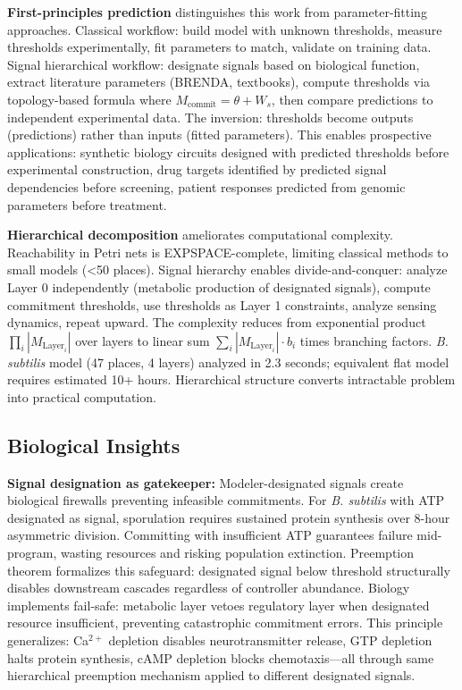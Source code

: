 \documentclass[10pt,letterpaper]{article}
\begin{document}
\textbf{First-principles prediction} distinguishes this work from parameter-fitting approaches. Classical workflow: build model with unknown thresholds, measure thresholds experimentally, fit parameters to match, validate on training data. Signal hierarchical workflow: designate signals based on biological function, extract literature parameters (BRENDA, textbooks), compute thresholds via topology-based formula where $M_{\text{commit}} = \theta + W_s$, then compare predictions to independent experimental data. The inversion: thresholds become outputs (predictions) rather than inputs (fitted parameters). This enables prospective applications: synthetic biology circuits designed with predicted thresholds before experimental construction, drug targets identified by predicted signal dependencies before screening, patient responses predicted from genomic parameters before treatment.

\textbf{Hierarchical decomposition} ameliorates computational complexity. Reachability in Petri nets is EXPSPACE-complete, limiting classical methods to small models (<50 places). Signal hierarchy enables divide-and-conquer: analyze Layer 0 independently (metabolic production of designated signals), compute commitment thresholds, use thresholds as Layer 1 constraints, analyze sensing dynamics, repeat upward. The complexity reduces from exponential product $\prod_i |M_{\text{Layer}_i}|$ over layers to linear sum $\sum_i |M_{\text{Layer}_i}| \cdot b_i$ times branching factors. \textit{B. subtilis} model (47 places, 4 layers) analyzed in 2.3 seconds; equivalent flat model requires estimated 10+ hours. Hierarchical structure converts intractable problem into practical computation.

\subsection{Biological Insights}

\textbf{Signal designation as gatekeeper:} Modeler-designated signals create biological firewalls preventing infeasible commitments. For \textit{B. subtilis} with ATP designated as signal, sporulation requires sustained protein synthesis over 8-hour asymmetric division. Committing with insufficient ATP guarantees failure mid-program, wasting resources and risking population extinction. Preemption theorem formalizes this safeguard: designated signal below threshold structurally disables downstream cascades regardless of controller abundance. Biology implements fail-safe: metabolic layer vetoes regulatory layer when designated resource insufficient, preventing catastrophic commitment errors. This principle generalizes: Ca$^{2+}$ depletion disables neurotransmitter release, GTP depletion halts protein synthesis, cAMP depletion blocks chemotaxis---all through same hierarchical preemption mechanism applied to different designated signals.
\end{document}
